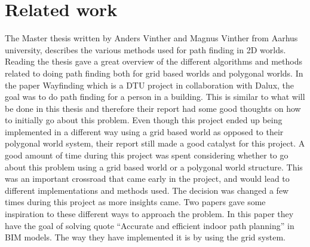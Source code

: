 
\section{Related work}
The Master thesis written by Anders Vinther and Magnus Vinther from Aarhus university, describes the various methods used for path finding in 2D worlds. Reading the thesis gave a great overview of the different algorithms and methods related to doing path finding both for grid based worlds and polygonal worlds.
\cite{vinther2015pathfinding}
In the paper Wayfinding \cite{wayfinding} which is a DTU project in collaboration with Dalux, the goal was to do path finding for a person in a building. This is similar to what will be done in this thesis and therefore their report had some good thoughts on how to initially go about this problem. Even though this project ended up being implemented in a different way using a grid based world as opposed to their polygonal world system, their report still made a good catalyst for this project.
A good amount of time during this project was spent considering whether to go about this problem using a grid based world or a polygonal world structure. This was an important crossroad that came early in the project, and would lead to different implementations and methods used. The decision was changed a few times during this project as more insights came. Two papers gave some inspiration to these different ways to approach the problem. 
In this paper \cite{xu2017bim} they have the goal of solving quote “Accurate and efficient indoor path planning” in BIM models. The way they have implemented it is by using the grid system. 




